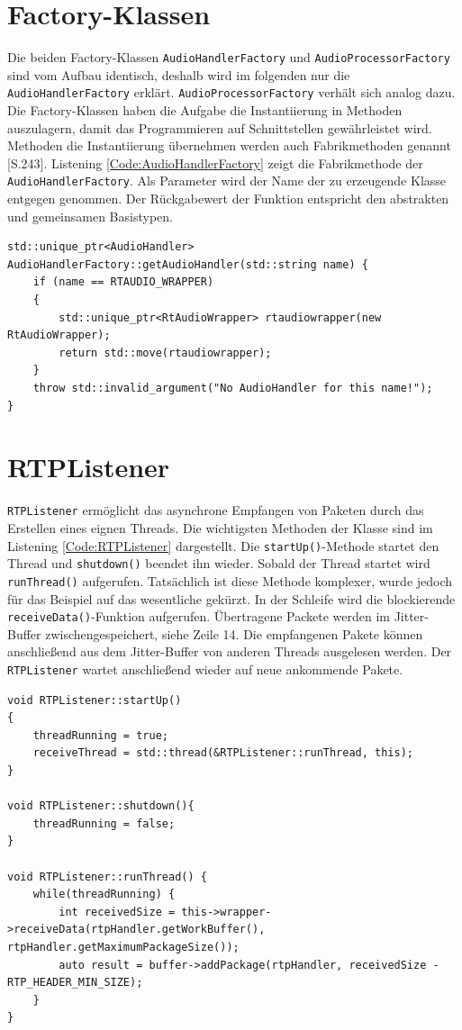 \section{Factory-Klassen}
Die beiden Factory-Klassen \texttt{AudioHandlerFactory} und \texttt{AudioProcessorFac\-tory} sind vom Aufbau identisch, deshalb wird im folgenden nur die \texttt{AudioHandler\-Factory} erklärt. \texttt{AudioProcessorFactory} verhält sich analog dazu. Die Factory-Klassen haben die Aufgabe die Instantiierung in Methoden auszulagern, damit das Programmieren auf Schnittstellen gewährleistet wird. Methoden die Instantiierung übernehmen werden auch Fabrikmethoden genannt \cite{Goll2013}[S.243]. Listening \ref{Code:AudioHandlerFactory} zeigt die Fabrikmethode der \texttt{AudioHandlerFactory}. Als Parameter wird der Name der zu erzeugende Klasse entgegen genommen. Der Rückgabewert der Funktion entspricht den abstrakten und gemeinsamen Basistypen.

\begin{lstlisting}[caption={Fabrikmethode der AudioHandlerFactory},label={Code:AudioHandlerFactory}]
std::unique_ptr<AudioHandler> AudioHandlerFactory::getAudioHandler(std::string name) {
	if (name == RTAUDIO_WRAPPER)
	{
		std::unique_ptr<RtAudioWrapper> rtaudiowrapper(new RtAudioWrapper);
		return std::move(rtaudiowrapper);
	}
	throw std::invalid_argument("No AudioHandler for this name!");
}
\end{lstlisting}

\section{RTPListener}
\texttt{RTPListener} ermöglicht das asynchrone Empfangen von Paketen durch das Erstellen eines eignen Threads. Die wichtigsten Methoden der Klasse sind im Listening \ref{Code:RTPListener} dargestellt. Die \texttt{startUp()}-Methode startet den Thread und \texttt{shutdown()} beendet ihn wieder. Sobald der Thread startet wird \texttt{runThread()} aufgerufen. Tatsächlich ist diese Methode komplexer, wurde jedoch für das Beispiel auf das wesentliche gekürzt. In der Schleife wird die blockierende \texttt{receiveData()}-Funktion aufgerufen. Übertragene Packete werden im Jitter-Buffer zwischengespeichert, siehe Zeile 14. Die empfangenen Pakete können anschließend aus dem Jitter-Buffer von anderen Threads ausgelesen werden. Der \texttt{RTPListener} wartet anschließend wieder auf neue ankommende Pakete.

\begin{lstlisting}[caption={Die wichtigsten Methoden des RTPListeners},label={Code:RTPListener}]
void RTPListener::startUp()
{
    threadRunning = true;
    receiveThread = std::thread(&RTPListener::runThread, this);
}

void RTPListener::shutdown(){
	threadRunning = false;
}

void RTPListener::runThread() {
	while(threadRunning) {
		int receivedSize = this->wrapper->receiveData(rtpHandler.getWorkBuffer(), rtpHandler.getMaximumPackageSize());
		auto result = buffer->addPackage(rtpHandler, receivedSize - RTP_HEADER_MIN_SIZE);
	}
}
\end{lstlisting}


